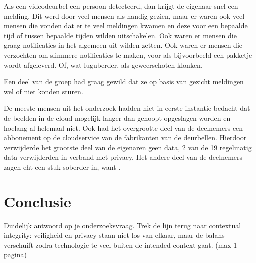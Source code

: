 \documentclass[nonacm,sigconf]{acmart}
\begin{document}
    Als een videodeurbel een persoon detecteerd, dan krijgt de eigenaar snel een melding.
    Dit werd door veel mensen als handig gezien, maar er waren ook veel mensen die vonden dat er te veel meldingen kwamen en deze voor een bepaalde tijd of tussen bepaalde tijden wilden uitschakelen.
    Ook waren er mensen die graag notificaties in het algemeen uit wilden zetten.
    Ook waren er mensen die verzochten om slimmere notificaties te maken, voor als bijvoorbeeld een pakketje wordt afgeleverd.
    Of, wat luguberder, als geweerschoten klonken.

    Een deel van de groep had graag gewild dat ze op basis van gezicht meldingen wel of niet konden sturen.

    De meeste mensen uit het onderzoek hadden niet in eerste instantie bedacht dat de beelden in de cloud mogelijk langer dan gehoopt opgeslagen worden en hoelang al helemaal niet.
    Ook had het overgrootte deel van de deelnemers een abbonement op de cloudservice van de fabrikanten van de deurbellen.
    Hierdoor verwijderde het grootste deel van de eigenaren geen data, 2 van de 19 regelmatig data verwijderden in verband met privacy.
    Het andere deel van de deelnemers zagen eht een stuk soberder in, want .

    \section{Conclusie}
    Duidelijk antwoord op je onderzoeksvraag.
    Trek de lijn terug naar contextual integrity: veiligheid en privacy staan niet los van elkaar, maar de balans verschuift zodra technologie te veel buiten de intended context gaat. (max 1 pagina)

    \printbibliography

    \balance %
\end{document}
